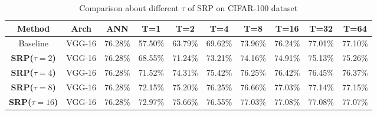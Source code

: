 \documentclass[letterpaper]{article} %
\begin{document}
\begin{table}[]
    \caption{Comparison about different $\tau$ of SRP on CIFAR-100 dataset}
    \renewcommand\arraystretch{1.15}
	\centering
	\begin{tabular}{cccccccccc}\hline
	Method & Arch & ANN & T=1 & T=2 & T=4 & T=8 & T=16 & T=32 & T=64\\ \hline
	Baseline & VGG-16 & 76.28\% & 57.50\% & 63.79\% & 69.62\% & 73.96\% & 76.24\% & 77.01\% & 77.10\% \\\hline
	\textbf{SRP($\tau=2$)} & VGG-16 & 76.28\% & 68.55\% & 71.24\% & 73.21\% & 74.16\% & 74.91\% & 75.13\% & 75.26\% \\ \hline
	\textbf{SRP($\tau=4$)} & VGG-16 & 76.28\% & 71.52\% & 74.31\% & 75.42\% & 76.25\% & 76.42\% & 76.45\% & 76.37\% \\ \hline
	\textbf{SRP($\tau=8$)} & VGG-16 & 76.28\% & 72.15\% & 75.20\% & 76.25\% & 76.66\% & 77.03\% & 77.14\% & 77.15\% \\ \hline
        \textbf{SRP($\tau=16$)} & VGG-16 & 76.28\% & 72.97\% & 75.66\% & 76.55\% & 77.03\% & 77.08\% & 77.08\% & 77.07\% \\ \hline  

\end{tabular}
\end{table}
\end{document}
